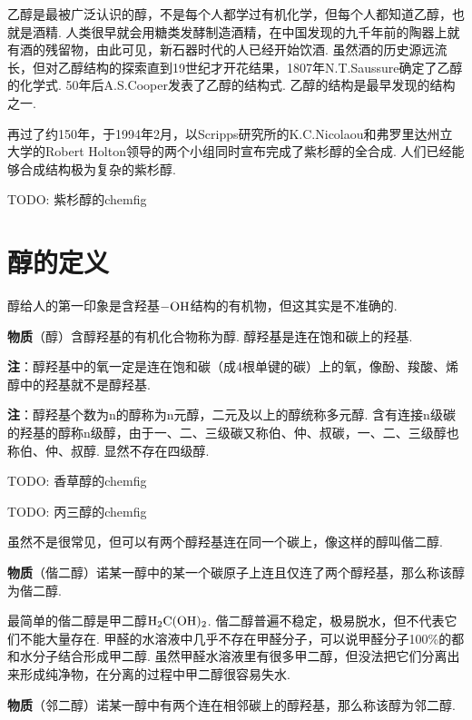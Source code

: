 \documentclass{article}
\begin{document}
乙醇是最被广泛认识的醇，不是每个人都学过有机化学，但每个人都知道乙醇，也就是酒精. 人类很早就会用糖类发酵制造酒精，在中国发现的九千年前的陶器上就有酒的残留物，由此可见，新石器时代的人已经开始饮酒. 虽然酒的历史源远流长，但对乙醇结构的探索直到19世纪才开花结果，1807年N.T.Saussure确定了乙醇的化学式. 50年后A.S.Cooper发表了乙醇的结构式. 乙醇的结构是最早发现的结构之一.

\begin{center}
\end{center}

再过了约150年，于1994年2月，以Scripps研究所的K.C.Nicolaou和弗罗里达州立大学的Robert Holton领导的两个小组同时宣布完成了紫杉醇的全合成. 人们已经能够合成结构极为复杂的紫杉醇.

TODO: 紫杉醇的chemfig

\section*{醇的定义}

醇给人的第一印象是含羟基$\ce{-OH}$结构的有机物，但这其实是不准确的.

\textbf{物质}（醇）含醇羟基的有机化合物称为醇. 醇羟基是连在饱和碳上的羟基.

\textbf{注}：醇羟基中的氧一定是连在饱和碳（成4根单键的碳）上的氧，像酚、羧酸、烯醇中的羟基就不是醇羟基.

\textbf{注}：醇羟基个数为n的醇称为n元醇，二元及以上的醇统称多元醇. 含有连接n级碳的羟基的醇称n级醇，由于一、二、三级碳又称伯、仲、叔碳，一、二、三级醇也称伯、仲、叔醇. 显然不存在四级醇.


TODO: 香草醇的chemfig

TODO: 丙三醇的chemfig

虽然不是很常见，但可以有两个醇羟基连在同一个碳上，像这样的醇叫偕二醇.

\textbf{物质}（偕二醇）诺某一醇中的某一个碳原子上连且仅连了两个醇羟基，那么称该醇为偕二醇.


最简单的偕二醇是甲二醇$\ce{H2C(OH)2}$. 偕二醇普遍不稳定，极易脱水，但不代表它们不能大量存在. 甲醛的水溶液中几乎不存在甲醛分子，可以说甲醛分子100\%的都和水分子结合形成甲二醇. 虽然甲醛水溶液里有很多甲二醇，但没法把它们分离出来形成纯净物，在分离的过程中甲二醇很容易失水.

\textbf{物质}（邻二醇）诺某一醇中有两个连在相邻碳上的醇羟基，那么称该醇为邻二醇.
\end{document}
